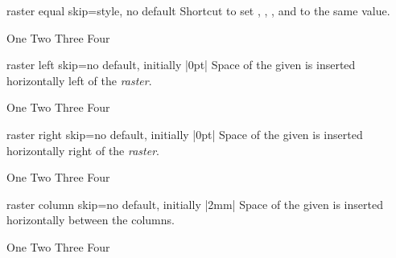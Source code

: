 \begin{docTcbKey}[][doc new=2015-01-08]{raster equal skip}{=}{style, no default}
  Shortcut to set
  ,
  ,
  , and
  to the same  value.
\begin{dispExample}
\begin{tcbitemize}[raster equal skip=4mm,
  size=small,colframe=red!50!black,colback=red!10!white]
  \tcbitem One
  \tcbitem Two
  \tcbitem Three
  \tcbitem Four
\end{tcbitemize}
\end{dispExample}
\end{docTcbKey}


\clearpage

\begin{docTcbKey}[][doc new=2014-11-10]{raster left skip}{=}{no default, initially |0pt|}
  Space of the given  is inserted horizontally left of the \emph{raster}.
\begin{dispExample}
\begin{tcbitemize}[raster left skip=2cm,
  size=small,colframe=red!50!black,colback=red!10!white]
  \tcbitem One
  \tcbitem Two
  \tcbitem Three
  \tcbitem Four
\end{tcbitemize}
\end{dispExample}
\end{docTcbKey}


\begin{docTcbKey}[][doc new=2014-11-10]{raster right skip}{=}{no default, initially |0pt|}
  Space of the given  is inserted horizontally right of the \emph{raster}.
\begin{dispExample}
\begin{tcbitemize}[raster right skip=2cm,
  size=small,colframe=red!50!black,colback=red!10!white]
  \tcbitem One
  \tcbitem Two
  \tcbitem Three
  \tcbitem Four
\end{tcbitemize}
\end{dispExample}
\end{docTcbKey}

\enlargethispage*{1cm}

\begin{docTcbKey}[][doc new=2014-11-10]{raster column skip}{=}{no default, initially |2mm|}
 Space of the given  is inserted horizontally between the columns.
\begin{dispExample}
\begin{tcbitemize}[raster column skip=2cm,
  size=small,colframe=red!50!black,colback=red!10!white]
  \tcbitem One
  \tcbitem Two
  \tcbitem Three
  \tcbitem Four
\end{tcbitemize}
\end{dispExample}
\end{docTcbKey}


